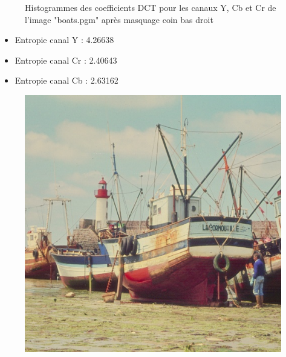 \documentclass[12pt]{report}
\begin{document}
\begin{figure}[H]
\begin{center}
\caption{Histogrammes des coefficients DCT pour les canaux Y, Cb et Cr de l'image "boats.pgm" après masquage coin bas droit}
\end{center}
\end{figure}

\begin{itemize}
\item Entropie canal Y : 4.26638
\item Entropie canal Cr : 2.40643
\item Entropie canal Cb : 2.63162\\
\end{itemize}

\begin{figure}[H]
\begin{center}
\includegraphics[scale=0.4]{../ImageRes/idct_masked0_result.jpg} 

\end{center}
\end{figure}
\end{document}
